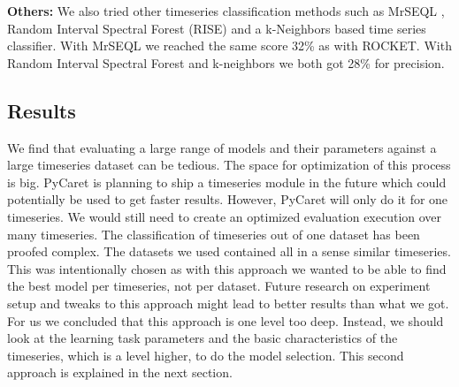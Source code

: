\textbf{Others:} We also tried other timeseries classification methods such as MrSEQL \cite{MRSEQL}, Random Interval Spectral Forest (RISE) \cite{RISE} and a k-Neighbors based time series classifier. With MrSEQL we reached the same score 32\% as with ROCKET. With Random Interval Spectral Forest and k-neighbors we both got 28\% for precision.

\subsection{Results}

We find that evaluating a large range of models and their parameters against a large timeseries dataset can be tedious. The space for optimization of this process is big. PyCaret \cite{PyCaret} is planning to ship a timeseries module in the future which could potentially be used to get faster results. However, PyCaret will only do it for one timeseries. We would still need to create an optimized evaluation execution over many timeseries.
The classification of timeseries out of one dataset has been proofed complex. The datasets we used contained all in a sense similar timeseries. This was intentionally chosen as with this approach we wanted to be able to find the best model per timeseries, not per dataset. Future research on experiment setup and tweaks to this approach might lead to better results than what we got. For us we concluded that this approach is one level too deep. Instead, we should look at the learning task parameters and the basic characteristics of the timeseries, which is a level higher, to do the model selection. This second approach is explained in the next section.
